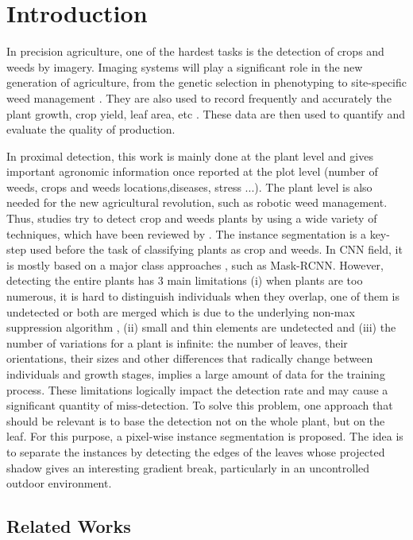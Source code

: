\documentclass[../thesis.tex]{subfiles}
\begin{document}
	\newpage
	\section{Introduction}
	
	In precision agriculture, one of the hardest tasks is the detection of crops and weeds by imagery. Imaging systems will play a significant role in the new generation of agriculture, from the genetic selection in phenotyping \cite{phenotyping} to site-specific weed management \cite{Louargant2017}. They are also used to record frequently and accurately the plant growth, crop yield, leaf area, etc \cite{Gee2021}. These data are then used to quantify and evaluate the quality of production.
    
    In proximal detection, this work is mainly done at the plant level and gives important agronomic information once reported at the plot level (number of weeds, crops and weeds locations,diseases, stress ...). The plant level is also needed for the new agricultural revolution, such as robotic weed management. Thus, studies try to detect crop and weeds plants by using a wide variety of techniques, which have been reviewed by \cite{WANG2019226}. The instance segmentation is a key-step used before the task of classifying plants as crop and weeds. In CNN field, it is mostly based on a major class approaches \cite{Hafiz_2020}, such as Mask-RCNN. However, detecting the entire plants has 3 main limitations (i) when plants are too numerous, it is hard to distinguish individuals when they overlap, one of them is undetected or both are merged which is due to the underlying non-max suppression algorithm \cite{BONNEAU2020105150}, (ii) small and thin elements are undetected and (iii) the number of variations for a plant is infinite: the number of leaves, their orientations, their sizes and other differences that radically change between individuals and growth stages, implies a large amount of data for the training process. These limitations logically impact the detection rate and may cause a significant quantity of miss-detection. To solve this problem, one approach that should be relevant is to base the detection not on the whole plant, but on the leaf. For this purpose, a pixel-wise instance segmentation is proposed. The idea is to separate the instances by detecting the edges of the leaves whose projected shadow gives an interesting gradient break, particularly in an uncontrolled outdoor environment.
    
    \subsection{Related Works}
    
\end{document}
